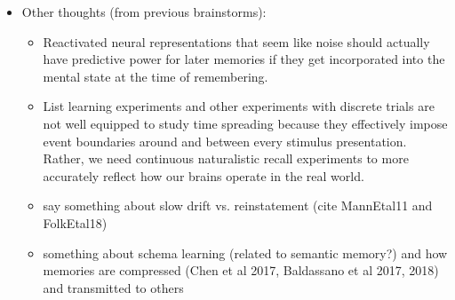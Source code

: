 \begin{itemize}
\item Other thoughts (from previous brainstorms):
    \begin{itemize}
    \item Reactivated neural representations that seem like noise should actually have predictive power for later memories if they get incorporated into the mental state at the time of remembering.
    \item List learning experiments and other experiments with discrete trials are not well equipped to study time spreading because they effectively impose event boundaries around and between every stimulus presentation.  Rather, we need continuous naturalistic recall experiments to more accurately reflect how our brains operate in the real world.
    \item say something about slow drift vs. reinstatement (cite MannEtal11 and FolkEtal18)
    \item something about schema learning (related to semantic memory?) and how memories are compressed (Chen et al 2017, Baldassano et al 2017, 2018) and transmitted to others
    \end{itemize}
  \end{itemize}


